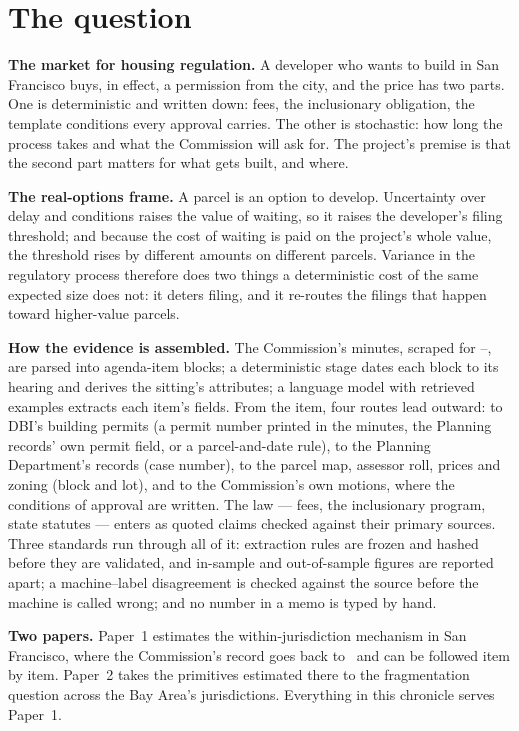 \documentclass[11pt]{article}
\begin{document}
\section{The question}\label{sec:chquestion}

\textbf{The market for housing regulation.} A developer who wants to build in San Francisco
buys, in effect, a permission from the city, and the price has two parts. One is deterministic
and written down: fees, the inclusionary obligation, the template conditions every approval
carries. The other is stochastic: how long the process takes and what the Commission will ask
for. The project's premise is that the second part matters for what gets built, and where.

\textbf{The real-options frame.} A parcel is an option to develop. Uncertainty over delay and
conditions raises the value of waiting, so it raises the developer's filing threshold; and
because the cost of waiting is paid on the project's whole value, the threshold rises by
different amounts on different parcels. Variance in the regulatory process therefore does two
things a deterministic cost of the same expected size does not: it deters filing, and it
re-routes the filings that happen toward higher-value parcels.

\textbf{How the evidence is assembled.} The Commission's minutes, scraped for
\chItemFirst--\chItemLast, are parsed into agenda-item blocks; a deterministic stage dates each
block to its hearing and derives the sitting's attributes; a language model with retrieved
examples extracts each item's fields. From the item, four routes lead outward: to DBI's building
permits (a permit number printed in the minutes, the Planning records' own permit field, or a
parcel-and-date rule), to the Planning Department's records (case number), to the parcel map,
assessor roll, prices and zoning (block and lot), and to the Commission's own motions, where the
conditions of approval are written. The law --- fees, the inclusionary program, state statutes
--- enters as quoted claims checked against their primary sources. Three standards run through
all of it: extraction rules are frozen and hashed before they are validated, and in-sample and
out-of-sample figures are reported apart; a machine--label disagreement is checked against the
source before the machine is called wrong; and no number in a memo is typed by hand.

\textbf{Two papers.} Paper~1 estimates the within-jurisdiction mechanism in San Francisco,
where the Commission's record goes back to \chItemFirst\ and can be followed item by item. Paper~2
takes the primitives estimated there to the fragmentation question across the Bay Area's
jurisdictions. Everything in this chronicle serves Paper~1.
\end{document}
